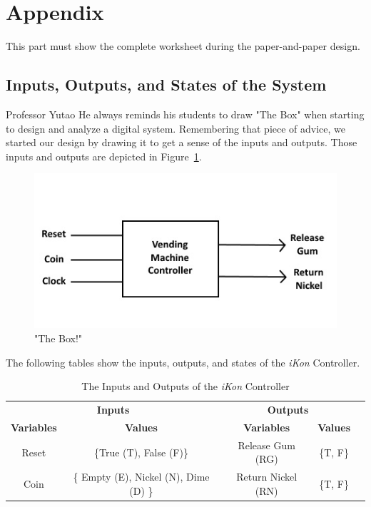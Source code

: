 \documentclass{article}
\begin{document}

\section{Appendix}
This part must show the complete worksheet during the paper-and-paper design.

\subsection{Inputs, Outputs, and States of the System}
Professor Yutao He always reminds his students to draw "The Box" when starting 
to design and analyze a digital system. Remembering that piece of advice, we 
started our design by drawing it to get a sense of the inputs and outputs. 
Those inputs and outputs are depicted in Figure~\ref{fig:box}. \\

\begin{figure}[h!]
\centering
\includegraphics[scale=0.7]{Box}
\caption{"The Box!"}
\label{fig:box}
\end{figure}

The following tables show the inputs, outputs, and states of the \textit{iKon} 
Controller.

\begin{table}[h]
\begin{center}
\begin{tabular}{|c|c|c|c|l}
\cline{1-4}
\multicolumn{2}{|c|}{ \textbf{Inputs} } & 
\multicolumn{2}{c|}{ \textbf{Outputs} } &  \\ \cline{1-4}
  \textbf{Variables} & \textbf{Values} & \textbf{Variables} & \textbf{Values} &
  \\ \cline{1-4}
  Reset & \{True (T), False (F)\} & Release Gum (RG) & \{T, F\} &  \\
  Coin & \{ Empty (E), Nickel (N), Dime (D) \} & Return Nickel (RN) & \{T, F\} 
  &  \\ \cline{1-4}
\end{tabular}
\caption{The Inputs and Outputs of the \textit{iKon} Controller}
\end{center}
\end{table}
\end{document}
